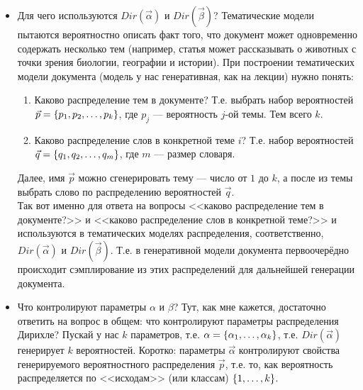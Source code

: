 \begin{solution}
\begin{itemize}
	\item Для чего используются $Dir(\vec{\alpha})$ и $Dir(\vec{\beta})$? Тематические модели пытаются вероятностно описать факт того, что документ может одновременно содержать несколько тем (например, статья может рассказывать о животных с точки зрения биологии, географии и истории). При построении тематических модели документа (модель у нас генеративная, как на лекции) нужно понять:
	\begin{enumerate}
		\item Каково распределение тем в документе? Т.е. выбрать набор вероятностей $\vec{p} = \left\lbrace p_1, p_2, \ldots, p_k \right\rbrace$, где $p_j$ --- вероятность $j$-ой темы. Тем всего $k$.
		\item Каково распределение слов в конкретной теме $i$? Т.е. набор вероятностей $\vec{q} = \left\lbrace q_1, q_2, \ldots, q_m \right\rbrace$, где $m$ --- размер словаря.
	\end{enumerate}
	Далее, имя $\vec{p}$ можно сгенерировать тему --- число от $1$ до $k$, а после из темы выбрать слово по распределению вероятностей $\vec{q}$.\\
	Так вот именно для ответа на вопросы <<каково распределение тем в документе?>> и <<каково распределение слов в конкретной теме?>> и используются в тематических моделях распределения, соответственно, $Dir(\vec{\alpha})$ и $Dir(\vec{\beta})$. Т.е. в генеративной модели документа первоочерёдно происходит сэмплирование из этих распределений для дальнейшей генерации документа.

	\item Что контролируют параметры $\alpha$ и $\beta$? Тут, как мне кажется, достаточно ответить на вопрос в общем: что контролируют параметры распределения Дирихле? Пускай у нас $k$ параметров, т.е. $\alpha = \left\lbrace \alpha_1, \ldots, \alpha_k \right\rbrace$, т.е. $Dir(\vec{\alpha})$ генерирует $k$ вероятностей. Коротко: параметры $\vec{\alpha}$ контролируют свойства генерируемого вероятностного распределения $\vec{p}$, т.е. то, как вероятность распределяется по <<исходам>> (или классам) $\left\lbrace 1, \ldots, k \right\rbrace$.


\end{itemize}
\end{solution}
